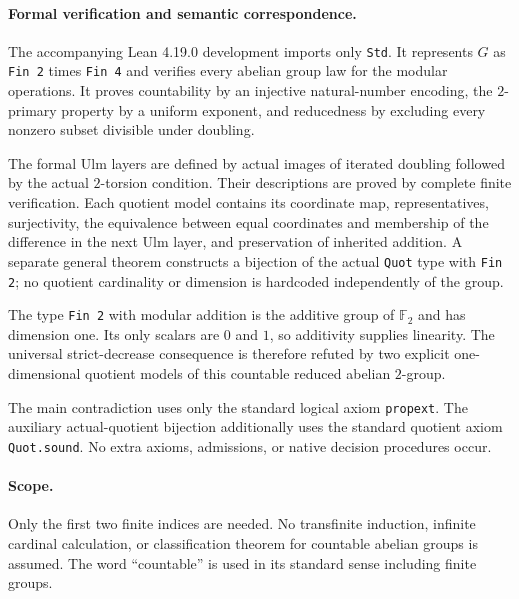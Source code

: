 \documentclass[10pt]{article}
\begin{document}
\paragraph{Formal verification and semantic correspondence.}
The accompanying Lean 4.19.0 development imports only \texttt{Std}. It represents $G$ as \texttt{Fin 2} times \texttt{Fin 4} and verifies every abelian group law for the modular operations. It proves countability by an injective natural-number encoding, the $2$-primary property by a uniform exponent, and reducedness by excluding every nonzero subset divisible under doubling.

The formal Ulm layers are defined by actual images of iterated doubling followed by the actual $2$-torsion condition. Their descriptions are proved by complete finite verification. Each quotient model contains its coordinate map, representatives, surjectivity, the equivalence between equal coordinates and membership of the difference in the next Ulm layer, and preservation of inherited addition. A separate general theorem constructs a bijection of the actual \texttt{Quot} type with \texttt{Fin 2}; no quotient cardinality or dimension is hardcoded independently of the group.

The type \texttt{Fin 2} with modular addition is the additive group of $\mathbb F_2$ and has dimension one. Its only scalars are $0$ and $1$, so additivity supplies linearity. The universal strict-decrease consequence is therefore refuted by two explicit one-dimensional quotient models of this countable reduced abelian $2$-group.

The main contradiction uses only the standard logical axiom \texttt{propext}. The auxiliary actual-quotient bijection additionally uses the standard quotient axiom \texttt{Quot.sound}. No extra axioms, admissions, or native decision procedures occur.

\paragraph{Scope.}
Only the first two finite indices are needed. No transfinite induction, infinite cardinal calculation, or classification theorem for countable abelian groups is assumed. The word ``countable'' is used in its standard sense including finite groups.
\end{document}
